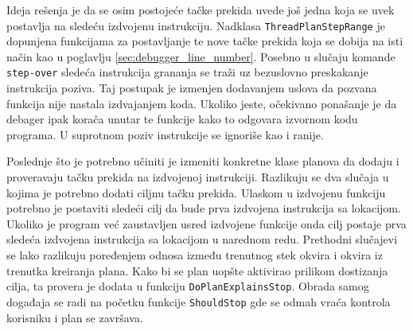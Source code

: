 \documentclass[12pt,oneside]{memoir}
\begin{document}
Ideja rešenja je da se osim postojeće tačke prekida uvede još jedna koja se uvek postavlja na sledeću izdvojenu instrukciju.
Nadklasa \verb|ThreadPlanStepRange| je dopunjena funkcijama za postavljanje te nove tačke prekida koja se dobija na isti način kao u poglavlju \ref{sec:debugger_line_number}.
Posebno u slučaju komande \verb|step-over| sledeća instrukcija grananja se traži uz bezuslovno preskakanje instrukcija poziva.
Taj postupak je izmenjen dodavanjem uslova da pozvana funkcija nije nastala izdvajanjem koda.
Ukoliko jeste, očekivano ponašanje je da debager ipak korača unutar te funkcije kako to odgovara izvornom kodu programa.
U suprotnom poziv instrukcije se ignoriše kao i ranije.

Poslednje što je potrebno učiniti je izmeniti konkretne klase planova da dodaju i proveravaju tačku prekida na izdvojenoj instrukciji.
Razlikuju se dva slučaja u kojima je potrebno dodati ciljnu tačku prekida.
Ulaskom u izdvojenu funkciju potrebno je postaviti sledeći cilj da bude prva izdvojena instrukcija sa lokacijom.
Ukoliko je program već zaustavljen usred izdvojene funkcije onda cilj postaje prva sledeća izdvojena instrukcija sa lokacijom u narednom redu.
Prethodni slučajevi se lako razlikuju poređenjem odnosa između trenutnog stek okvira i okvira iz trenutka kreiranja plana.
Kako bi se plan uopšte aktivirao prilikom dostizanja cilja, ta provera je dodata u funkciju \verb|DoPlanExplainsStop|.
Obrada samog događaja se radi na početku funkcije \verb|ShouldStop| gde se odmah vraća kontrola korisniku i plan se završava.
\end{document}
